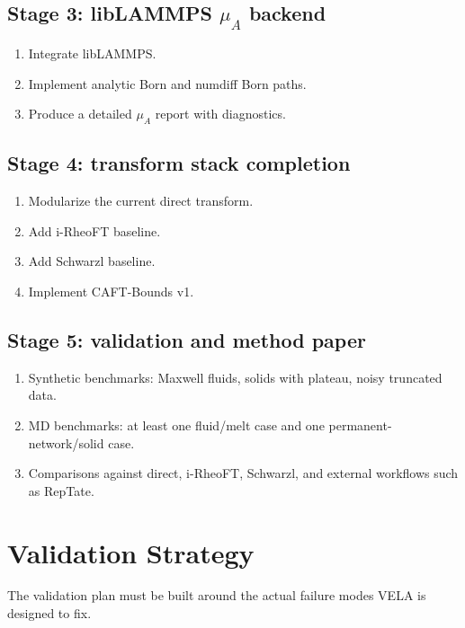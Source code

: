 \documentclass[11pt]{article}
\begin{document}
\subsection{Stage 3: libLAMMPS $\mu_A$ backend}
\begin{enumerate}[leftmargin=2em]
  \item Integrate libLAMMPS.
  \item Implement analytic Born and numdiff Born paths.
  \item Produce a detailed $\mu_A$ report with diagnostics.
\end{enumerate}

\subsection{Stage 4: transform stack completion}
\begin{enumerate}[leftmargin=2em]
  \item Modularize the current direct transform.
  \item Add i-RheoFT baseline.
  \item Add Schwarzl baseline.
  \item Implement CAFT-Bounds v1.
\end{enumerate}

\subsection{Stage 5: validation and method paper}
\begin{enumerate}[leftmargin=2em]
  \item Synthetic benchmarks: Maxwell fluids, solids with plateau, noisy truncated data.
  \item MD benchmarks: at least one fluid/melt case and one permanent-network/solid case.
  \item Comparisons against direct, i-RheoFT, Schwarzl, and external workflows such as RepTate.
\end{enumerate}

\section{Validation Strategy}

The validation plan must be built around the actual failure modes VELA is designed to fix.
\end{document}
